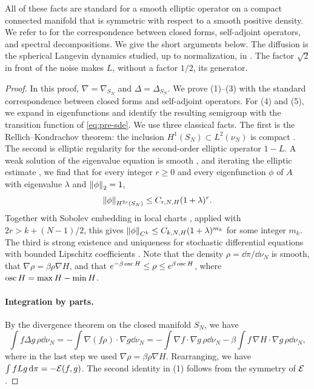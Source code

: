 All of these facts are standard for a smooth elliptic operator on a compact connected manifold that is symmetric with respect to a smooth positive density. We refer to \cite[Section~1.7]{BakryGentilLedoux2014} for the correspondence between closed forms, self-adjoint operators, and spectral decompositions. We give the short arguments below. The diffusion is the spherical Langevin dynamics studied, up to normalization, in \cite{GheissariJagannath2019,BenArousJagannath2018,ElAlaouiMontanariSellke2025}. The factor $\sqrt2$ in front of the noise makes $L$, without a factor $1/2$, its generator.

\begin{proof}
In this proof, $\nabla=\nabla_{S_N}$ and $\Delta=\Delta_{S_N}$. We prove (1)--(3) with the standard correspondence between closed forms and self-adjoint operators. For (4) and (5), we expand in eigenfunctions and identify the resulting semigroup with the transition function of \eqref{eq:pre-sde}. We use three classical facts. The first is the Rellich--Kondrachov theorem: the inclusion $H^1(S_N)\subset L^2(\nu_N)$ is compact \cite[Theorem~15.10]{Dyatlov2026Notes}. The second is elliptic regularity for the second-order elliptic operator $1-L$. A weak solution of the eigenvalue equation is smooth \cite[Theorem~15.1]{Dyatlov2026Notes}, and iterating the elliptic estimate \cite[Theorem~15.7]{Dyatlov2026Notes}, we find that for every integer $r\ge0$ and every eigenfunction $\phi$ of $A$ with eigenvalue $\lambda$ and $\left\lVert\phi\right\rVert_2=1$,
\[
\left\lVert\phi\right\rVert_{H^{2r}(S_N)}\le C_{r,N,H}(1+\lambda)^r.
\]
Together with Sobolev embedding in local charts \cite[Theorem~12.16]{Dyatlov2026Notes}, applied with $2r>k+(N-1)/2$, this gives $\left\lVert\phi\right\rVert_{C^k}\le C_{k,N,H}(1+\lambda)^{m_k}$ for some integer $m_k$. The third is strong existence and uniqueness for stochastic differential equations with bounded Lipschitz coefficients \cite[Theorem~4.1]{VaradhanSDENotes}.
Note that the density $\rho=\dd\pi/\dd\nu_N$ is smooth, that $\nabla\rho=\beta\rho\nabla H$, and that $e^{-\beta\operatorname{osc} H}\le\rho\le e^{\beta\operatorname{osc} H}$, where $\operatorname{osc} H=\max H-\min H$.

\paragraph{Integration by parts.} By the divergence theorem on the closed manifold $S_N$, we have
\[
\int f\Delta g\,\rho\dd\nu_N=-\int\nabla(f\rho)\cdot\nabla g\dd\nu_N=-\int\nabla f\cdot\nabla g\,\rho\dd\nu_N-\beta\int f\,\nabla H\cdot\nabla g\,\rho\dd\nu_N,
\]
where in the last step we used $\nabla\rho=\beta\rho\nabla H$. Rearranging, we have $\int fLg\,\mathrm d\pi=-\mathcal E(f,g)$. The second identity in (1) follows from the symmetry of $\mathcal E$.


\end{proof}
